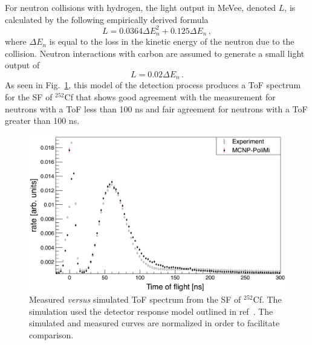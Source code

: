 For neutron collisions with hydrogen, the light output in MeVee, denoted $L$, is calculated by the following empirically derived formula~\cite{MPPost}
\begin{displaymath}
L = 0.0364 \Delta E_n^2 +  0.125 \Delta E_n \, ,
\end{displaymath}
where $\Delta E_n$ is equal to the loss in the kinetic energy of the neutron due to the collision.
Neutron interactions with carbon are assumed to generate a small light output of
\begin{displaymath}
L = 0.02 \Delta E_n \, .
\end{displaymath}
As seen in Fig.~\ref{fig:Cf252MCNPVsEXP}, this model of the detection process produces a ToF spectrum for the SF of $^{252}$Cf that shows good agreement with the measurement for neutrons with a ToF less than 100 ns and fair agreement for neutrons with a ToF greater than 100 ns.
\begin{figure}
    \centering
    \includegraphics[width = \figsize\textwidth]{Cf252MCNPVsEXP.png}
    \caption{
    Measured \textit{versus} simulated ToF spectrum from the SF of $^{252}$Cf.
    The simulation used the detector response model outlined in ref~\cite{MPPost}.
    The simulated and measured curves are normalized in order to facilitate comparison.
    }
    \label{fig:Cf252MCNPVsEXP}
\end{figure} %

